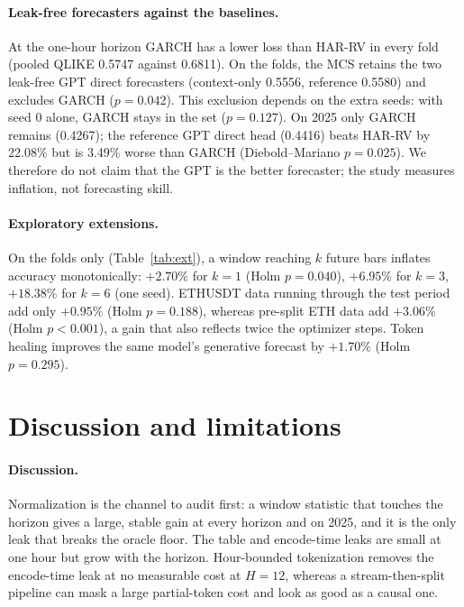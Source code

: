 \documentclass{article}
\begin{document}
\paragraph{Leak-free forecasters against the baselines.}
At the one-hour horizon GARCH has a lower loss than HAR-RV in every fold (pooled QLIKE 0.5747
against 0.6811). On the folds, the MCS retains the two leak-free GPT direct forecasters
(context-only 0.5556, reference 0.5580) and excludes GARCH ($p=0.042$). This exclusion depends on
the extra seeds: with seed 0 alone, GARCH stays in the set ($p=0.127$). On 2025 only GARCH remains
(0.4267); the reference GPT direct head (0.4416) beats HAR-RV by 22.08\% but is 3.49\% worse than
GARCH (Diebold--Mariano $p=0.025$). We therefore do not claim that the GPT is the better forecaster;
the study measures inflation, not forecasting skill.

\paragraph{Exploratory extensions.}
On the folds only (Table~\ref{tab:ext}), a window reaching $k$ future bars inflates accuracy
monotonically: $+2.70\%$ for $k=1$ (Holm $p=0.040$), $+6.95\%$ for $k=3$, $+18.38\%$ for $k=6$ (one
seed). ETHUSDT data running through the test period add only $+0.95\%$ (Holm $p=0.188$), whereas
pre-split ETH data add $+3.06\%$ (Holm $p<0.001$), a gain that also reflects twice the optimizer
steps. Token healing improves the same model's generative forecast by $+1.70\%$ (Holm $p=0.295$).

\section{Discussion and limitations}

\paragraph{Discussion.}
Normalization is the channel to audit first: a window statistic that touches the horizon gives a
large, stable gain at every horizon and on 2025, and it is the only leak that breaks the oracle floor.
The table and encode-time leaks are small at one hour but grow with the horizon. Hour-bounded
tokenization removes the encode-time leak at no measurable cost at $H=12$, whereas a stream-then-split
pipeline can mask a large partial-token cost and look as good as a causal one.
\end{document}
